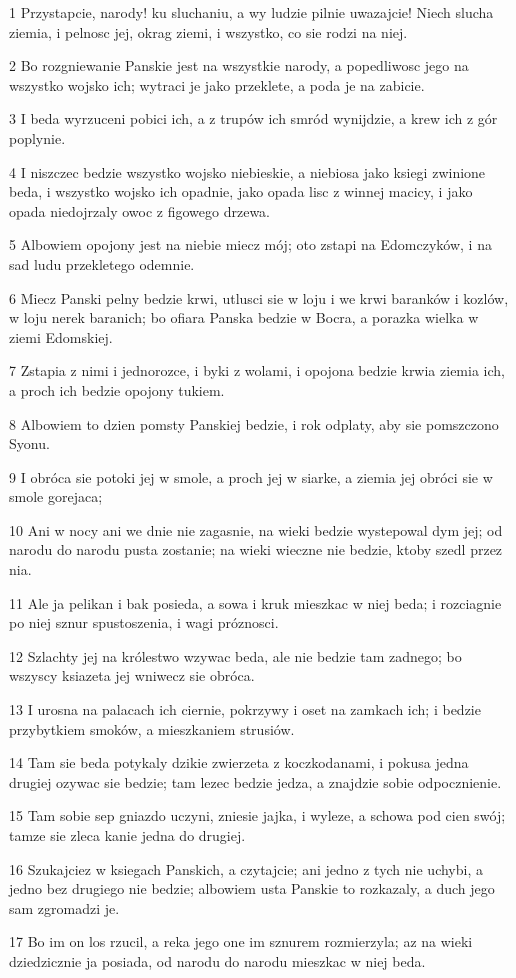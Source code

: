 \par 1 Przystapcie, narody! ku sluchaniu, a wy ludzie pilnie uwazajcie! Niech slucha ziemia, i pelnosc jej, okrag ziemi, i wszystko, co sie rodzi na niej.
\par 2 Bo rozgniewanie Panskie jest na wszystkie narody, a popedliwosc jego na wszystko wojsko ich; wytraci je jako przeklete, a poda je na zabicie.
\par 3 I beda wyrzuceni pobici ich, a z trupów ich smród wynijdzie, a krew ich z gór poplynie.
\par 4 I niszczec bedzie wszystko wojsko niebieskie, a niebiosa jako ksiegi zwinione beda, i wszystko wojsko ich opadnie, jako opada lisc z winnej macicy, i jako opada niedojrzaly owoc z figowego drzewa.
\par 5 Albowiem opojony jest na niebie miecz mój; oto zstapi na Edomczyków, i na sad ludu przekletego odemnie.
\par 6 Miecz Panski pelny bedzie krwi, utlusci sie w loju i we krwi baranków i kozlów, w loju nerek baranich; bo ofiara Panska bedzie w Bocra, a porazka wielka w ziemi Edomskiej.
\par 7 Zstapia z nimi i jednorozce, i byki z wolami, i opojona bedzie krwia ziemia ich, a proch ich bedzie opojony tukiem.
\par 8 Albowiem to dzien pomsty Panskiej bedzie, i rok odplaty, aby sie pomszczono Syonu.
\par 9 I obróca sie potoki jej w smole, a proch jej w siarke, a ziemia jej obróci sie w smole gorejaca;
\par 10 Ani w nocy ani we dnie nie zagasnie, na wieki bedzie wystepowal dym jej; od narodu do narodu pusta zostanie; na wieki wieczne nie bedzie, ktoby szedl przez nia.
\par 11 Ale ja pelikan i bak posieda, a sowa i kruk mieszkac w niej beda; i rozciagnie po niej sznur spustoszenia, i wagi próznosci.
\par 12 Szlachty jej na królestwo wzywac beda, ale nie bedzie tam zadnego; bo wszyscy ksiazeta jej wniwecz sie obróca.
\par 13 I urosna na palacach ich ciernie, pokrzywy i oset na zamkach ich; i bedzie przybytkiem smoków, a mieszkaniem strusiów.
\par 14 Tam sie beda potykaly dzikie zwierzeta z koczkodanami, i pokusa jedna drugiej ozywac sie bedzie; tam lezec bedzie jedza, a znajdzie sobie odpocznienie.
\par 15 Tam sobie sep gniazdo uczyni, zniesie jajka, i wyleze, a schowa pod cien swój; tamze sie zleca kanie jedna do drugiej.
\par 16 Szukajciez w ksiegach Panskich, a czytajcie; ani jedno z tych nie uchybi, a jedno bez drugiego nie bedzie; albowiem usta Panskie to rozkazaly, a duch jego sam zgromadzi je.
\par 17 Bo im on los rzucil, a reka jego one im sznurem rozmierzyla; az na wieki dziedzicznie ja posiada, od narodu do narodu mieszkac w niej beda.

